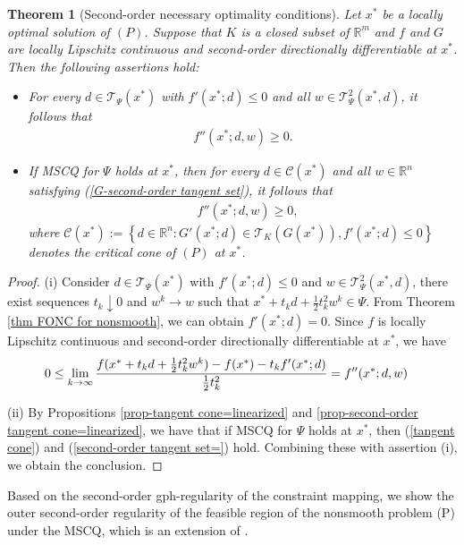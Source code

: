 \documentclass[11pt]{article}
\newtheorem{theorem}{Theorem}[section]
\theoremstyle{definition}
\theoremstyle{remark}
\numberwithin{equation}{section}
\begin{document}
\begin{theorem}[Second-order necessary optimality conditions]\label{thm SONC for nonsmooth}
 Let $x^*$ be a locally optimal solution of $(P)$. Suppose that $K$ is a closed subset of  $\mathbb{R}^m$ and
 $f$ and $G$ are locally Lipschitz continuous and second-order directionally differentiable at
 $x^*$. Then the following assertions hold:
 \begin{itemize}
   \item[(i)]For every $d\in \mathcal{T}_{\Psi}(x^*)$ with $f'(x^*;d)\le 0$ and all $w\in \mathcal{T}_{\Psi}^2(x^*,d)$, it follows that
   \begin{align*}
      f''(x^*;d,w)\ge 0.
   \end{align*}
   \item [(ii)]If MSCQ for $\Psi$ holds at $x^*$, then
    for every $d\in \mathcal{C}(x^*)$ and all $w\in
       \mathbb{R}^n$ satisfying (\ref{G-second-order tangent set}), it follows that
   \begin{align*}
      &  f''(x^*;d,w)\ge 0,
   \end{align*}
   where   $\mathcal{C}(x^*):=\left\{d\in \mathbb{R}^n: G'(x^*;d)\in \mathcal{T}_{K}(G(x^*)),f'(x^*;d)\le
   0\right\}$ denotes the critical cone of
   $(P)$ at $x^*$.
 \end{itemize}
\end{theorem}
\begin{proof}
  (i) Consider $d\in \mathcal{T}_{\Psi}(x^*)$ with $f'(x^*;d)\le 0$ and $w\in \mathcal{T}_{\Psi}^2(x^*,d)$,
    there exist sequences $t_k\downarrow 0$ and $w^k\to w$ such that $x^*+t_k d+\frac{1}{2}t_k^2w^k\in \Psi$.
From  Theorem \ref{thm
  FONC for nonsmooth}, we can obtain $f'(x^*;d)=0$.
   Since $f$ is locally Lipschitz continuous and second-order
  directionally differentiable at $x^*$, we have
  \begin{align}
 & 0\le \lim_{k\to \infty}\frac{f(x^*+t_k
 d+\frac{1}{2}t_k^2w^k)-f(x^*)-t_kf'(x^*;d)}{\frac{1}{2}t_k^2}=f''(x^*;d,w)\notag
  \end{align}

  (ii) By Propositions \ref{prop-tangent cone=linearized} and \ref{prop-second-order tangent cone=linearized}, we
  have that if MSCQ for $\Psi$ holds at $x^*$, then (\ref{tangent cone}) and (\ref{second-order tangent set=})
  hold. Combining these with assertion (i), we obtain the conclusion.
\end{proof}

Based on the second-order  gph-regularity of the constraint mapping, we show the outer second-order regularity of the feasible region of the nonsmooth problem (P) under the MSCQ, which is an extension of \cite[Proposition 3.88]{Bonnans}.
\end{document}
